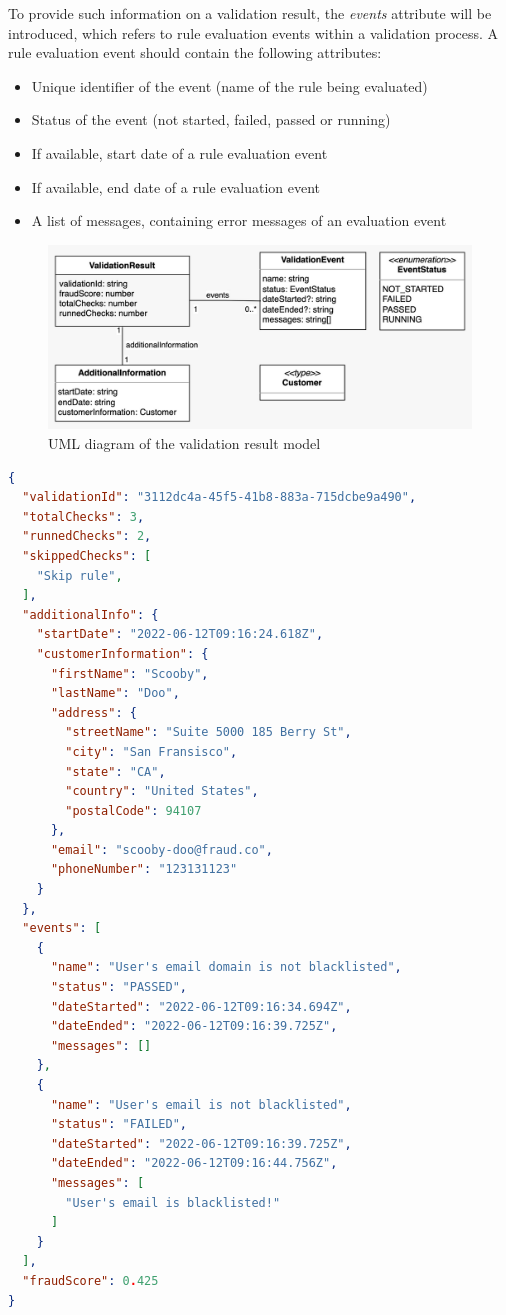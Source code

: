     To provide such information on a validation result, the \emph{events} attribute will be introduced, which refers to rule evaluation events within a validation process. A rule evaluation event should contain the following attributes:

    \begin{itemize}
      \item Unique identifier of the event (name of the rule being evaluated)
      \item Status of the event (not started, failed, passed or running) 
      \item If available, start date of a rule evaluation event 
      \item If available, end date of a rule evaluation event 
      \item A list of messages, containing error messages of an evaluation event
    \end{itemize}

    \begin{figure}[!ht]
      \includegraphics[width=\textwidth]{diagrams/entity_validation_result.jpeg}
      \caption{UML diagram of the validation result model}
      \label{fig:uml_validation_result}
    \end{figure}
    
    \begin{lstlisting}[caption={Validation result example (JSON)}, language=json]
{
  "validationId": "3112dc4a-45f5-41b8-883a-715dcbe9a490",
  "totalChecks": 3,
  "runnedChecks": 2,
  "skippedChecks": [
    "Skip rule",
  ],
  "additionalInfo": {
    "startDate": "2022-06-12T09:16:24.618Z",
    "customerInformation": {
      "firstName": "Scooby",
      "lastName": "Doo",
      "address": {
        "streetName": "Suite 5000 185 Berry St",
        "city": "San Fransisco",
        "state": "CA",
        "country": "United States",
        "postalCode": 94107
      },
      "email": "scooby-doo@fraud.co",
      "phoneNumber": "123131123"
    }
  },
  "events": [
    {
      "name": "User's email domain is not blacklisted",
      "status": "PASSED",
      "dateStarted": "2022-06-12T09:16:34.694Z",
      "dateEnded": "2022-06-12T09:16:39.725Z",
      "messages": []
    },
    {
      "name": "User's email is not blacklisted",
      "status": "FAILED",
      "dateStarted": "2022-06-12T09:16:39.725Z",
      "dateEnded": "2022-06-12T09:16:44.756Z",
      "messages": [
        "User's email is blacklisted!"
      ]
    }
  ],
  "fraudScore": 0.425  
}
    \end{lstlisting}